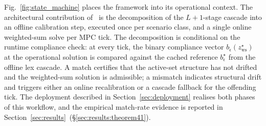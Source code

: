 Fig.~\ref{fig:state_machine} places the framework into its operational context. The architectural contribution of~\cite{lcp2025} is the decomposition of the $L+1$-stage cascade into an offline calibration step, executed once per scenario class, and a single online weighted-sum solve per MPC tick. The decomposition is conditional on the runtime compliance check: at every tick, the binary compliance vector $b_{\epsilon}(z_{\mathrm{ws}}^{\star})$ at the operational solution is compared against the cached reference $b_{\epsilon}^{\star}$ from the offline lex cascade. A match certifies that the active-set structure has not drifted and the weighted-sum solution is admissible; a mismatch indicates structural drift and triggers either an online recalibration or a cascade fallback for the offending tick. The deployment described in Section~\ref{sec:deployment} realises both phases of this workflow, and the empirical match-rate evidence is reported in Section~\ref{sec:results}~(\S\ref{sec:results:theorem41}).

